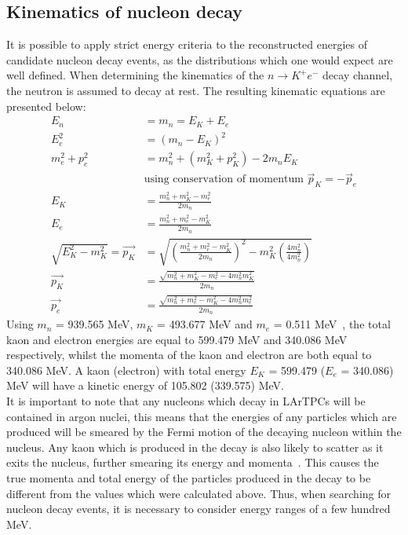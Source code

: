 \subsection{Kinematics of nucleon decay} \label{sec:NDKKin}
It is possible to apply strict energy criteria to the reconstructed energies of candidate nucleon decay events, as the distributions which one would expect are well defined. When determining the kinematics of the $n \rightarrow K^{+} e^{-}$ decay channel, the neutron is assumed to decay at rest. The resulting kinematic equations are presented below:
\begin{align}
  E_{n} &= m_{n} = E_{K} + E_{e} \nonumber \\
  E_{e}^{2} &= (m_{n} - E_{K})^{2} \nonumber \\
  m_{e}^{2} + p_{e}^{2} &= m_{n}^{2} + (m_{K}^{2} + p_{K}^{2}) - 2m_{n}E_{K} \nonumber \\
  &\text{using conservation of momentum $\vec{p}_{K} = -\vec{p}_{e}$} \nonumber \\  
  E_{K} &= \frac{m_n^{2} + m_{K}^{2} - m_{e}^{2}}{2m_{n}} \label{eq:DecKEn} \\
  E_{e} &= \frac{m_n^{2} + m_{e}^{2} - m_{K}^{2}}{2m_{n}} \label{eq:DecEEn} \\
  \sqrt{E_{K}^{2} - m_{K}^{2}} = \vec{p_{K}} &= \sqrt{ \left(\frac{m_n^{2} + m_{e}^{2} - m_{K}^{2}}{2m_{n}}\right)^{2} - m_{K}^{2}\left(\frac{4m_{n}^2}{4m_n^{2}}\right) } \nonumber \\
  \vec{p_{K}} &= \frac{ \sqrt{m_n^{2} + m_{K}^{2} - m_{e}^{2} - 4m_{n}^{2}m_{K}^{2} } }{ 2m_{n} } \label{eq:DecEMom} \\
  \vec{p_{e}} &= \frac{ \sqrt{m_n^{2} + m_{e}^{2} - m_{K}^{2} - 4m_{n}^{2}m_{e}^{2} } }{ 2m_{n} } \label{eq:DecKMom}
\end{align}
Using $m_{n}$ = 939.565 MeV, $m_{K}$ = 493.677 MeV and $m_{e}$ = 0.511 MeV~\citep{PDGReview}, the total kaon and electron energies are equal to 599.479 MeV and 340.086 MeV respectively, whilst the momenta of the kaon and electron are both equal to 340.086 MeV. A kaon (electron) with total energy $E_{K}$ = 599.479 ($E_{e}$ = 340.086) MeV will have a kinetic energy of 105.802 (339.575) MeV. \\

It is important to note that any nucleons which decay in LArTPCs will be contained in argon nuclei, this means that the energies of any particles which are produced will be smeared by the Fermi motion of the decaying nucleon within the nucleus. Any kaon which is produced in the decay is also likely to scatter as it exits the nucleus, further smearing its energy and momenta~\citep{Stefan:2008zi}. This causes the true momenta and total energy of the particles produced in the decay to be different from the values which were calculated above. Thus, when searching for nucleon decay events, it is necessary to consider energy ranges of a few hundred MeV. \\


